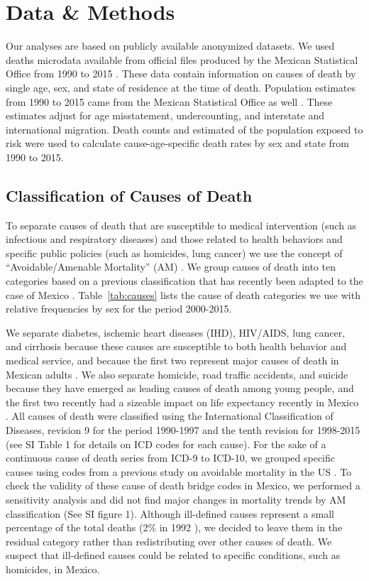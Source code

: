 \documentclass{bmcart}
\begin{document}
\section*{Data \& Methods} 
Our analyses are based on publicly available anonymized datasets. We used deaths microdata available from official files produced by the
Mexican Statistical Office from 1990 to 2015 \cite{INEGI}. These data contain
information on causes of death by single age, sex, and state of residence at the
time of death. Population estimates from 1990 to 2015 came from the Mexican Statistical Office as well \cite{INEGI}. These estimates adjust for age misstatement, undercounting, and interstate and international migration. Death counts and estimated of the population exposed to risk were used to calculate cause-age-specific death rates by sex and state from 1990 to 2015.

\subsection*{Classification of Causes of Death}

To separate causes of death that are susceptible to medical intervention (such as
infectious and respiratory diseases) and those related to health behaviors and
specific public policies (such as homicides, lung cancer) we use the concept of
``Avoidable/Amenable Mortality'' (AM) \cite{nolte&mckee2004, nolte&mckee2008}. We group causes of death into ten categories based on a previous classification  \cite{elo2014} that has recently been adapted to the case of Mexico \cite{Aburto2015}. Table~\ref{tab:causes} lists the cause of death categories we use with relative frequencies by sex for the period 2000-2015.



We separate diabetes, ischemic heart diseases (IHD), HIV/AIDS, lung
cancer, and cirrhosis because these causes are susceptible to both health behavior
and medical service, and because the first two represent major causes of death
in Mexican adults \cite{gomez2016dissonant}. We also separate
homicide, road traffic accidents, and suicide because they have emerged as
leading causes of death among young people, and the first two recently had a sizeable
impact on life expectancy recently in Mexico \cite{Aburto2015}. All causes of death were classified using the International Classification of Diseases, revision 9 for the period 1990-1997 and the tenth revision for 1998-2015 (see SI Table 1 for details on ICD codes for each cause). For the sake of a continuous cause of death series from ICD-9 to ICD-10, we grouped specific causes using codes from a previous study on avoidable mortality in the US \cite{elo2014}. To check the validity of these cause of death bridge codes in Mexico, we performed a sensitivity analysis and did not find major changes in mortality trends by AM classification (See SI figure 1). Although ill-defined causes represent a small percentage of the total deaths (2\% in 1992 \cite{rivera2002epidemiological}), we decided to leave them in the residual category rather than redistributing over other causes of death. We suspect that ill-defined causes could be related to specific conditions, such as homicides, in Mexico.
\end{document}
